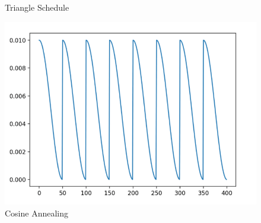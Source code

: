 \begin{itemize}
\begin{figure}[!ht]
\begin{minipage}[b]{0.4\textwidth}
    \caption{Triangle Schedule}
    \label{fig:triangle_schedule}
  \end{minipage}
  \hfill
  \begin{minipage}[b]{0.4\textwidth}
    \includegraphics[width=\textwidth]{./imgs/2019A7PS0097P-12.png}
    \caption{Cosine Annealing}
  \end{minipage}
\end{figure}
\end{itemize}